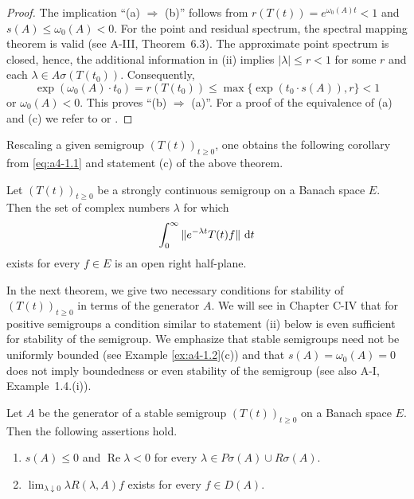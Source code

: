 \begin{proof} The implication ``(a) $ \Rightarrow $ (b)'' follows from $ r(T(t)) = e^{\omega_{0}(A) t} < 1 $ and $ s(A) \leq \omega_{0}(A) < 0 $. For the point and residual spectrum, the spectral mapping theorem is valid (see A-III, Theorem~6.3). The approximate point spectrum is closed, hence, the additional information in (ii)
implies $ |\lambda| \leq r < 1 $ for some $ r $ and each $ \lambda \in A\sigma(T(t_0)) $. 
Consequently, 
\[
\exp(\omega_{0}(A) \cdot t_0) = r(T(t_0)) \leq \max\{\exp(t_0 \cdot s(A)), r\} < 1
\]
or $ \omega_{0}(A) < 0 $. 
This proves \textquotedblleft (b) $\Rightarrow$ (a)\textquotedblright. 
For a proof of the equivalence of (a) and (c) we refer to \citet{datko:1972} or \citet[Theorem~4.4.1]{pazy:1983}. 
\end{proof}
Rescaling a given semigroup $ (T(t))_{t \geq 0} $, one obtains the following corollary from \eqref{eq:a4-1.1} and statement (c) of the above theorem.
\begin{corollary} \label{cor:a4-1.12} 
Let $ (T(t))_{t \geq 0} $ be a strongly continuous semigroup on a Banach space $ E $. Then the set of complex numbers $ \lambda $ for which
\[
\int_{0}^{\infty} \|e^{-\lambda t} T (t) f \| \,\mathop{}\!\mathrm{d}{t} 
\]
exists for every $ f \in E $  is an open right half-plane.
\end{corollary}
In the next theorem, we give two necessary conditions for stability of $ (T(t))_{t \geq 0} $ in terms of the generator $ A $. We will see in Chapter C-IV that for positive semigroups a condition similar to statement (ii) below is even sufficient for stability of the semigroup. 
We emphasize that stable semigroups need not be uniformly bounded (see Example \ref{ex:a4-1.2}(c)) and that $ s(A) = \omega_{0}(A) = 0 $ does not imply boundedness or even stability of the semigroup (see also A-I, Example~1.4.(i)).
\begin{theorem} \label{thm:a4-1.13} Let $ A $ be the generator of a stable semigroup $ (T(t))_{t \geq 0} $ on a Banach space $ E $. Then the following assertions hold.
\begin{enumerate}[\upshape (i)]
    \item 
    $ s(A) \leq 0 $ and $ \operatorname{Re} \lambda < 0 $ for every $ \lambda \in P\sigma (A) \cup R\sigma(A) $.
    
    \item 
    $ \lim_{\lambda \downarrow 0} \lambda R(\lambda, A) f $ exists for every $ f \in D(A) $.
\end{enumerate}
\end{theorem}
